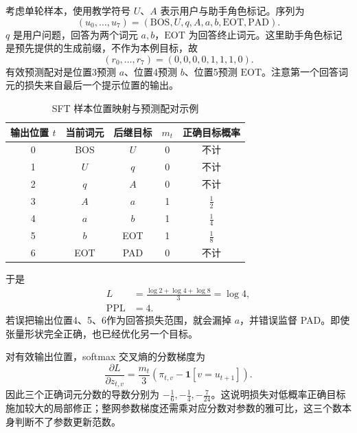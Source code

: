 \documentclass[../textbook.tex]{subfiles}
\begin{document}
\begin{example}


考虑单轮样本，使用教学符号 $U$、$A$ 表示用户与助手角色标记。序列为
\begin{equation*}
 (u_0,\ldots,u_7)=(\mathrm{BOS},U,q,A,a,b,\mathrm{EOT},\mathrm{PAD}).
\end{equation*}
$q$ 是用户问题，回答为两个词元 $a,b$，$\mathrm{EOT}$ 为回答终止词元。这里助手角色标记是预先提供的生成前缀，不作为本例目标，故
\begin{equation*}
 (r_0,\ldots,r_7)=(0,0,0,0,1,1,1,0).
\end{equation*}
有效预测配对是位置3预测 $a$、位置4预测 $b$、位置5预测 $\mathrm{EOT}$。注意第一个回答词元的损失来自最后一个提示位置的输出。

\begin{table}[htbp]
\centering
\caption{SFT 样本位置映射与预测配对示例}
\label{tab:sft-shift-example}
\begin{tabular}{ccccc}
\toprule 输出位置 $t$ & 当前词元 & 后继目标 & $m_t$ & 正确目标概率\\\midrule
0 & BOS & $U$ & 0 & 不计\\
1 & $U$ & $q$ & 0 & 不计\\
2 & $q$ & $A$ & 0 & 不计\\
3 & $A$ & $a$ & 1 & $\frac{1}{2}$\\
4 & $a$ & $b$ & 1 & $\frac{1}{4}$\\
5 & $b$ & EOT & 1 & $\frac{1}{8}$\\
6 & EOT & PAD & 0 & 不计\\
\bottomrule
\end{tabular}
\end{table}

于是
\begin{align*}
 L &= \frac{\log2+\log4+\log8}{3} = \log4, \\
 \mathrm{PPL} &= 4.
\end{align*}
若误把输出位置4、5、6作为回答损失范围，就会漏掉 $a$，并错误监督 PAD。即使张量形状完全正确，也已经优化另一个目标。

对有效输出位置，softmax 交叉熵的分数梯度为
\begin{equation*}
 \frac{\partial L}{\partial z_{t,v}}
 =\frac{m_t}{3}\left(\pi_{t,v}-\mathbf1[v=u_{t+1}]\right).
\end{equation*}
因此三个正确词元分数的导数分别为 $-\frac{1}{6},-\frac{1}{4},-\frac{7}{24}$。这说明损失对低概率正确目标施加较大的局部修正；整网参数梯度还需乘对应分数对参数的雅可比，这三个数本身判断不了参数更新范数。


\end{example}
\end{document}
